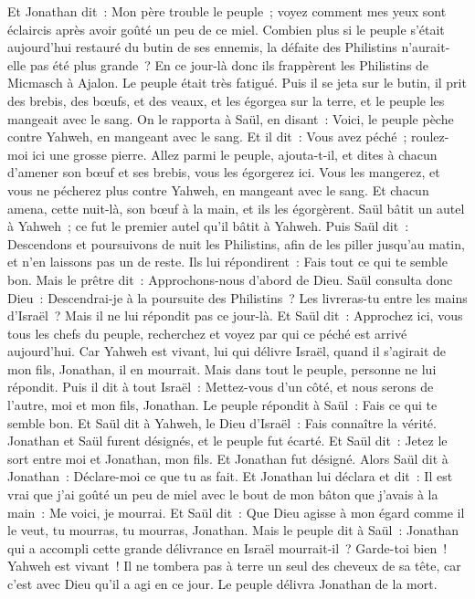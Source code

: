 \begin{multicols}{2}
Et Jonathan dit~: Mon père trouble le peuple~; voyez comment mes yeux sont éclaircis après avoir goûté un peu de ce miel.
Combien plus si le peuple s'était aujourd'hui restauré du butin de ses ennemis, la défaite des Philistins n'aurait-elle pas été plus grande~?
En ce jour-là donc ils frappèrent les Philistins de Micmasch à Ajalon. Le peuple était très fatigué.
Puis il se jeta sur le butin, il prit des brebis, des bœufs, et des veaux, et les égorgea sur la terre, et le peuple les mangeait avec le sang.
On le rapporta à Saül, en disant~: Voici, le peuple pèche contre Yahweh, en mangeant avec le sang. Et il dit~: Vous avez péché~; roulez-moi ici une grosse pierre.
Allez parmi le peuple, ajouta-t-il, et dites à chacun d'amener son bœuf et ses brebis, vous les égorgerez ici. Vous les mangerez, et vous ne pécherez plus contre Yahweh, en mangeant avec le sang. Et chacun amena, cette nuit-là, son bœuf à la main, et ils les égorgèrent.
Saül bâtit un autel à Yahweh~; ce fut le premier autel qu'il bâtit à Yahweh.
Puis Saül dit~: Descendons et poursuivons de nuit les Philistins, afin de les piller jusqu'au matin, et n'en laissons pas un de reste. Ils lui répondirent~: Fais tout ce qui te semble bon. Mais le prêtre dit~: Approchons-nous d'abord de Dieu.
Saül consulta donc Dieu~: Descendrai-je à la poursuite des Philistins~? Les livreras-tu entre les mains d'Israël~? Mais il ne lui répondit pas ce jour-là.
Et Saül dit~: Approchez ici, vous tous les chefs du peuple, recherchez et voyez par qui ce péché est arrivé aujourd'hui.
Car Yahweh est vivant, lui qui délivre Israël, quand il s'agirait de mon fils, Jonathan, il en mourrait. Mais dans tout le peuple, personne ne lui répondit.
Puis il dit à tout Israël~: Mettez-vous d'un côté, et nous serons de l'autre, moi et mon fils, Jonathan. Le peuple répondit à Saül~: Fais ce qui te semble bon.
Et Saül dit à Yahweh, le Dieu d'Israël~: Fais connaître la vérité. Jonathan et Saül furent désignés, et le peuple fut écarté.
Et Saül dit~: Jetez le sort entre moi et Jonathan, mon fils. Et Jonathan fut désigné.
Alors Saül dit à Jonathan~: Déclare-moi ce que tu as fait. Et Jonathan lui déclara et dit~: Il est vrai que j'ai goûté un peu de miel avec le bout de mon bâton que j'avais à la main~: Me voici, je mourrai.
Et Saül dit~: Que Dieu agisse à mon égard comme il le veut, tu mourras, tu mourras, Jonathan.
Mais le peuple dit à Saül~: Jonathan qui a accompli cette grande délivrance en Israël mourrait-il~? Garde-toi bien~! Yahweh est vivant~! Il ne tombera pas à terre un seul des cheveux de sa tête, car c'est avec Dieu qu'il a agi en ce jour. Le peuple délivra Jonathan de la mort.

\end{multicols}
